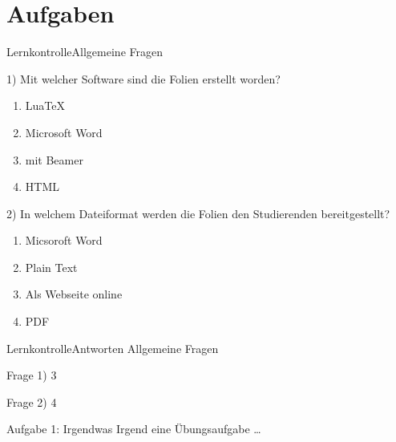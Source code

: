\section{Aufgaben}
\begin{frame}{Lernkontrolle}{Allgemeine Fragen}
    \begin{footnotesize}
        1) Mit welcher Software sind die Folien erstellt worden?

        \begin{enumerate}
            \item LuaTeX
            \item Microsoft Word
            \item \latex mit Beamer
            \item HTML
        \end{enumerate}

        2) In welchem Dateiformat werden die Folien den Studierenden bereitgestellt?

        \begin{enumerate}
            \item Micsoroft Word
            \item Plain Text
            \item Als Webseite online
            \item PDF
        \end{enumerate}
    \end{footnotesize}
\end{frame}

\begin{frame}{Lernkontrolle}{Antworten}
    Allgemeine Fragen
    \medskip

    \begin{footnotesize}
    Frage 1) 3
    \medskip

    Frage 2) 4
    \end{footnotesize}
\end{frame}

\begin{frame}{Aufgabe 1: Irgendwas}
    Irgend eine Übungsaufgabe …
\end{frame}
